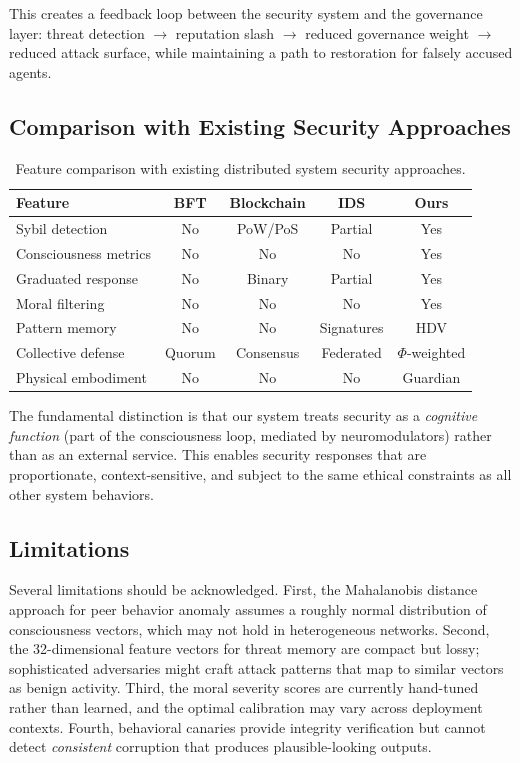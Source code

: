 \documentclass[11pt,a4paper]{article}
\begin{document}
This creates a feedback loop between the security system and the governance layer: threat detection $\to$ reputation slash $\to$ reduced governance weight $\to$ reduced attack surface, while maintaining a path to restoration for falsely accused agents.

\subsection{Comparison with Existing Security Approaches}

\begin{table}[h]
\centering
\caption{Feature comparison with existing distributed system security approaches.}
\label{tab:security_comparison}
\begin{tabular}{p{3.5cm}cccc}
\toprule
\textbf{Feature} & \textbf{BFT} & \textbf{Blockchain} & \textbf{IDS} & \textbf{Ours} \\
\midrule
Sybil detection & No & PoW/PoS & Partial & Yes \\
Consciousness metrics & No & No & No & Yes \\
Graduated response & No & Binary & Partial & Yes \\
Moral filtering & No & No & No & Yes \\
Pattern memory & No & No & Signatures & HDV \\
Collective defense & Quorum & Consensus & Federated & $\Phi$-weighted \\
Physical embodiment & No & No & No & Guardian \\
\bottomrule
\end{tabular}
\end{table}

The fundamental distinction is that our system treats security as a \emph{cognitive function} (part of the consciousness loop, mediated by neuromodulators) rather than as an external service. This enables security responses that are proportionate, context-sensitive, and subject to the same ethical constraints as all other system behaviors.

\subsection{Limitations}

Several limitations should be acknowledged. First, the Mahalanobis distance approach for peer behavior anomaly assumes a roughly normal distribution of consciousness vectors, which may not hold in heterogeneous networks. Second, the 32-dimensional feature vectors for threat memory are compact but lossy; sophisticated adversaries might craft attack patterns that map to similar vectors as benign activity. Third, the moral severity scores are currently hand-tuned rather than learned, and the optimal calibration may vary across deployment contexts. Fourth, behavioral canaries provide integrity verification but cannot detect \emph{consistent} corruption that produces plausible-looking outputs.
\end{document}
